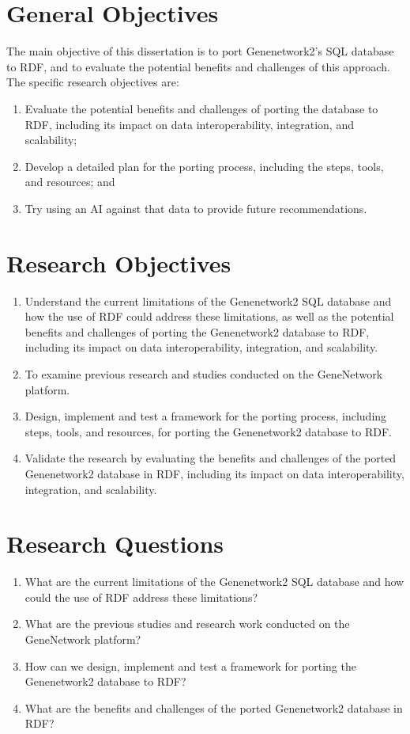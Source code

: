 \section{General Objectives}

The main objective of this dissertation is to port Genenetwork2's SQL database to RDF, and to evaluate the potential benefits and challenges of this approach.  The specific research objectives are:

\begin{enumerate}
\item Evaluate the potential benefits and challenges of porting the database to RDF, including its impact on data interoperability, integration, and scalability;
\item Develop a detailed plan for the porting process, including the steps, tools, and resources; and
\item Try using an AI against that data to provide future recommendations.
\end{enumerate}


\section{Research Objectives}

\begin{enumerate}
\item Understand the current limitations of the Genenetwork2 SQL database and how the use of RDF could address these limitations, as well as the potential benefits and challenges of porting the Genenetwork2 database to RDF, including its impact on data interoperability, integration, and scalability.
\item To examine previous research and studies conducted on the GeneNetwork platform.
\item Design, implement and test a framework for the porting process, including steps, tools, and resources, for porting the Genenetwork2 database to RDF.
\item Validate the research by evaluating the benefits and challenges of the ported Genenetwork2 database in RDF, including its impact on data interoperability, integration, and scalability.
\end{enumerate}

\section{Research Questions}

\begin{enumerate}
\item What are the current limitations of the Genenetwork2 SQL database and how could the use of RDF address these limitations?
\item What are the previous studies and research work conducted on the GeneNetwork platform?
\item How can we design, implement and test a framework for porting the Genenetwork2 database to RDF?
\item What are the benefits and challenges of the ported Genenetwork2 database in RDF?
\end{enumerate}

